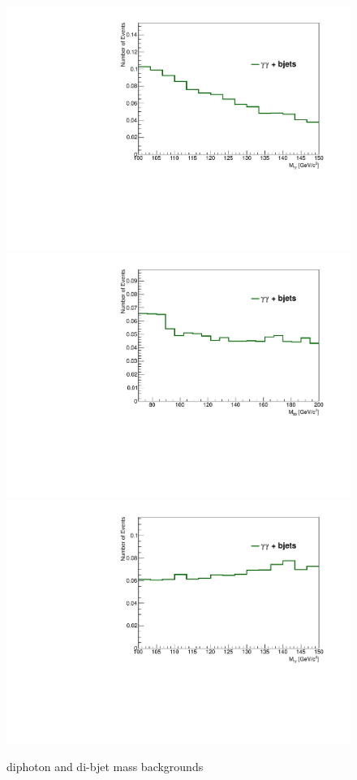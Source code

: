 \documentclass{cmspaper}
\begin{document}
\begin{figure}[h]
\includegraphics[scale=0.35, angle=0]{figures/MassGG_s1.pdf}	
\includegraphics[scale=0.35, angle=0]{figures/MassBB_s2.pdf}	
\includegraphics[scale=0.35, angle=0]{figures/MassGG_s2.pdf}	
\caption{diphoton and di-bjet mass backgrounds}
\label{fig:Mbb_Mgg}
\end{figure}
\end{document}
